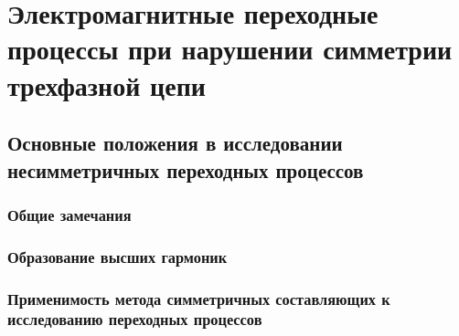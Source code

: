 \part{Электромагнитные переходные процессы при нарушении симметрии трехфазной цепи}

\chapter{Основные положения в исследовании несимметричных переходных процессов}
\label{chap:11}

\section{Общие замечания}
\label{sec:11-1}


\section{Образование высших гармоник}
\label{sec:11-2}


\section{Применимость метода симметричных составляющих к исследованию переходных процессов}
\label{sec:11-3}
